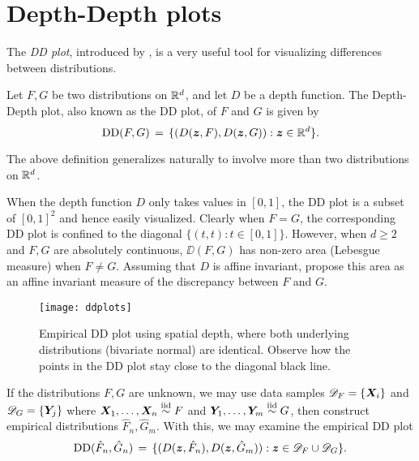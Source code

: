 \section{Depth-Depth plots}
\label{sec:multivariate_ddplots}

The \emph{DD plot}, introduced by \textcite{liu-parelius-singh-1999}, is a
very useful tool for visualizing differences between distributions.

\begin{definition}[DD plot] \label{def:ddplot}
    Let $F, G$ be two distributions on $\mathbb{R}^d$, and let $D$ be a depth
    function. The Depth-Depth plot, also known as the DD plot, of $F$ and $G$
    is given by
    \begin{equation}
        \operatorname{DD}(F, G) \,=\, \{(D(\bm{z}, F), D(\bm{z}, G)) : \bm{z} \in \mathbb{R}^d\}.
    \end{equation}
\end{definition}
\begin{remark}
    The above definition generalizes naturally to involve more than two
    distributions on $\mathbb{R}^d$.
\end{remark}

When the depth function $D$ only takes values in $[0, 1]$, the DD plot is a
subset of $[0, 1]^2$ and hence easily visualized.
Clearly when $F = G$, the corresponding DD plot is confined to the diagonal
$\{(t, t) : t \in [0, 1]\}$.
However, when $d \geq 2$ and $F, G$ are absolutely continuous, $\DD(F, G)$ has
non-zero area (Lebesgue measure) when $F \neq G$.
Assuming that $D$ is affine invariant, \textcite{liu-parelius-singh-1999}
propose this area as an affine invariant measure of the discrepancy between
$F$ and $G$.



\begin{figure}
    \centering
    \texttt{[image: ddplots]}
    \caption{
        Empirical DD plot using spatial depth, where both underlying
        distributions (bivariate normal) are identical.
        Observe how the points in the DD plot stay close to the diagonal black
        line.
    }
    \label{fig:ddplots_identical}
\end{figure}



If the distributions $F, G$ are unknown, we may use data samples
$\mathscr{D}_F = \{\bm{X}_i\}$ and $\mathscr{D}_G = \{\bm{Y}_j\}$ where $\bm{X}_1,
\dots, \bm{X}_n \overset{\text{iid}}{\sim} F$ and $\bm{Y}_1, \dots, \bm{Y}_m \overset{\text{iid}}{\sim} G$, then construct
empirical distributions $\hat{F}_n, \hat{G}_m$.
With this, we may examine the empirical DD plot
\begin{equation}
    \operatorname{DD}(\hat{F}_n, \hat{G}_n) \,=\, \{(D(\bm{z}, \hat{F}_n), D(\bm{z}, \hat{G}_m)) : \bm{z} \in \mathscr{D}_F \cup \mathscr{D}_G\}.
\end{equation}

